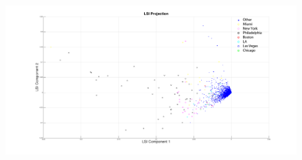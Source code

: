 \documentclass[11pt]{article}
\begin{document}
\begin{figure}
	\centering
	\includegraphics[scale = 0.35]{LSI_projection.png}
\end{figure}
\end{document}
